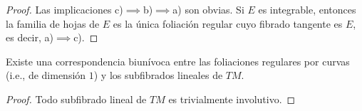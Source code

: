 \begin{proof}
Las implicaciones c)$\implies$b)$\implies$a) son obvias. Si $E$ es integrable, entonces la familia de hojas de $E$ es la única foliación regular cuyo fibrado tangente es $E$, es decir, a)$\implies$c).
\end{proof}

\begin{corollary}
Existe una correspondencia biunívoca entre las foliaciones regulares por curvas (i.e., de dimensión $1$) y los subfibrados lineales de $TM$.
\end{corollary}

\begin{proof}
Todo subfibrado lineal de $TM$ es trivialmente involutivo.
\end{proof}
